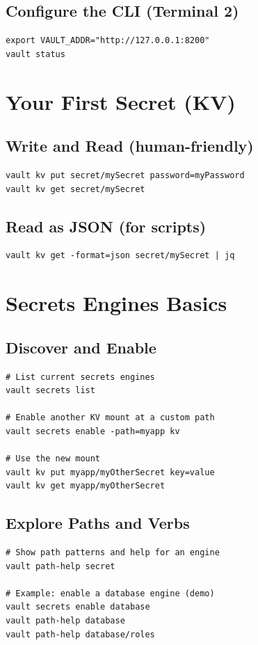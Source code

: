 \documentclass[11pt]{article}
\begin{document}
\subsection{Configure the CLI (Terminal 2)}
\begin{verbatim}
export VAULT_ADDR="http://127.0.0.1:8200"
vault status
\end{verbatim}

\section{Your First Secret (KV)}
\subsection{Write and Read (human-friendly)}
\begin{verbatim}
vault kv put secret/mySecret password=myPassword
vault kv get secret/mySecret
\end{verbatim}

\subsection{Read as JSON (for scripts)}
\begin{verbatim}
vault kv get -format=json secret/mySecret | jq
\end{verbatim}

\section{Secrets Engines Basics}
\subsection{Discover and Enable}
\begin{verbatim}
# List current secrets engines
vault secrets list

# Enable another KV mount at a custom path
vault secrets enable -path=myapp kv

# Use the new mount
vault kv put myapp/myOtherSecret key=value
vault kv get myapp/myOtherSecret
\end{verbatim}

\subsection{Explore Paths and Verbs}
\begin{verbatim}
# Show path patterns and help for an engine
vault path-help secret

# Example: enable a database engine (demo)
vault secrets enable database
vault path-help database
vault path-help database/roles
\end{verbatim}
\end{document}
